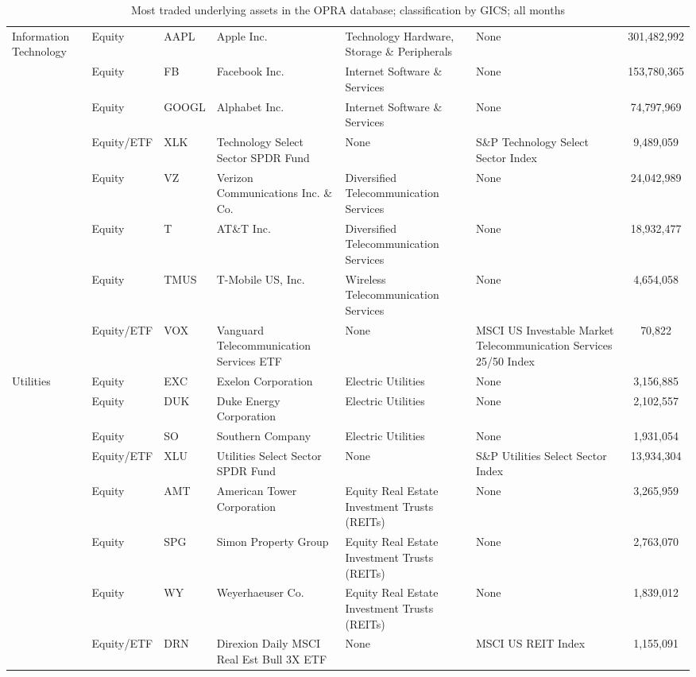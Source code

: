 \documentclass[a4paper,12pt]{article}
\theoremstyle{plain}
\theoremstyle{definition}
\begin{document}
\begin{landscape}
\begin{table}[ht!]
{\begin{tabular}{l l l l l p{5cm} c}
\hline 
 \multirow{5}{4cm}{Information Technology} & Equity & AAPL & Apple Inc. & Technology Hardware, Storage \& Peripherals  & None  & 301,482,992  \\ 
                  & Equity         & FB     & Facebook Inc.           &  Internet Software \& Services & None & 153,780,365  \\  
                  & Equity         & GOOGL    &  Alphabet Inc.    &    Internet Software \& Services  & None   & 74,797,969    \\
                  & Equity/ETF & XLK  & Technology Select Sector SPDR Fund & None & S\&P Technology Select Sector Index& 9,489,059  \\ 
\hline
 \multirow{5}{4cm}{Telecommunication Services} & Equity & VZ & Verizon Communications Inc. \& Co. & Diversified Telecommunication Services  & None & 24,042,989  \\ 
                  & Equity         & T     & AT\&T Inc.           &  Diversified Telecommunication Services & None & 18,932,477  \\  
                  & Equity         &  TMUS  & T-Mobile US, Inc.     &   Wireless Telecommunication Services   & None  & 4,654,058     \\
                  & Equity/ETF & VOX  & Vanguard Telecommunication Services ETF & None & MSCI US Investable Market Telecommunication Services 25/50 Index & 70,822  \\ 
\hline
 \multirow{5}{*}{Utilities} & Equity & EXC & Exelon Corporation & Electric Utilities  & None  & 3,156,885  \\ 
                  & Equity         & DUK     & Duke Energy Corporation     &  Electric Utilities & None & 2,102,557  \\  
                  & Equity         & SO   &  Southern Company    &   Electric Utilities   & None   &  1,931,054   \\
                  & Equity/ETF & XLU  & Utilities Select Sector SPDR Fund & None & S\&P Utilities Select Sector Index & 13,934,304  \\ 
\hline
 \multirow{5}{*}{Real Estate} & Equity        & AMT & American Tower Corporation & Equity Real Estate Investment Trusts (REITs)  & None  & 3,265,959  \\ 
                    & Equity & SPG     & Simon Property Group &  Equity Real Estate Investment Trusts (REITs) & None & 2,763,070  \\ 
                    & Equity         & WY   &  Weyerhaeuser Co.    &    Equity Real Estate Investment Trusts (REITs) & None  & 1,839,012    \\ 
                    & Equity/ETF & DRN  & Direxion Daily MSCI Real Est Bull 3X ETF & None & MSCI US REIT Index & 1,155,091  \\ 								
\hline \hline
\end{tabular}
}
\caption{\footnotesize Most traded underlying assets in the OPRA database; classification by GICS; all months}
\label{sumstat}
\end{table} 



\end{landscape}
\end{document}

